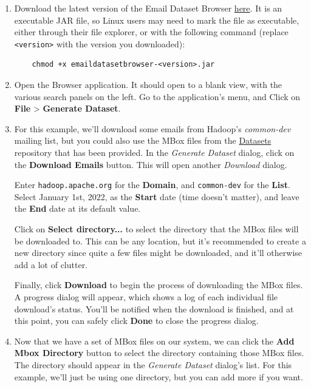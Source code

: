 \documentclass[a4paper, 12pt]{article}
\begin{document}
		\begin{enumerate}
			\item Download the latest version of the Email Dataset Browser \href{https://github.com/ArchitecturalKnowledgeAnalysis/EmailDatasetBrowser/releases/latest}{here}. It is an executable JAR file, so Linux users may need to mark the file as executable, either through their file explorer, or with the following command (replace \texttt{<version>} with the version you downloaded):
				\begin{verbatim}
	chmod +x emaildatasetbrowser-<version>.jar
				\end{verbatim}
			
			\item Open the Browser application. It should open to a blank view, with the various search panels on the left. Go to the application's menu, and Click on \textbf{File} > \textbf{Generate Dataset}.
			
			\item For this example, we'll download some emails from Hadoop's \textit{common-dev} mailing list, but you could also use the MBox files from the \href{https://github.com/ArchitecturalKnowledgeAnalysis/Datasets}{Datasets} repository that has been provided. In the \textit{Generate Dataset} dialog, click on the \textbf{Download Emails} button. This will open another \textit{Download} dialog.
			
				Enter \texttt{hadoop.apache.org} for the \textbf{Domain}, and \texttt{common-dev} for the \textbf{List}. Select January 1st, 2022, as the \textbf{Start} date (time doesn't matter), and leave the \textbf{End} date at its default value.
				
				Click on \textbf{Select directory...} to select the directory that the MBox files will be downloaded to. This can be any location, but it's recommended to create a new directory since quite a few files might be downloaded, and it'll otherwise add a lot of clutter.
				
				Finally, click \textbf{Download} to begin the process of downloading the MBox files. A progress dialog will appear, which shows a log of each individual file download's status. You'll be notified when the download is finished, and at this point, you can safely click \textbf{Done} to close the progress dialog.
			
			\item Now that we have a set of MBox files on our system, we can click the \textbf{Add Mbox Directory} button to select the directory containing those MBox files. The directory should appear in the \textit{Generate Dataset} dialog's list. For this example, we'll just be using one directory, but you can add more if you want.
			

\end{enumerate}
\end{document}
